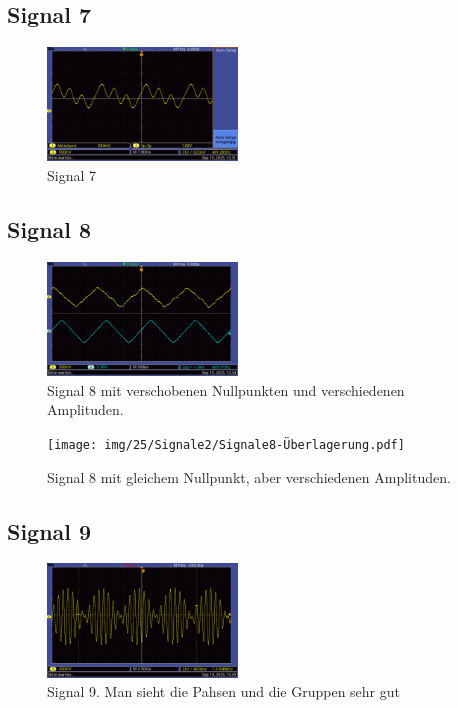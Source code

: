 \subsection*{Signal 7}
\begin{figure} [h!]
    \centering
        \includegraphics[width=0.45\textwidth]{img/25/Signale2/Signal7.pdf}
    \caption{Signal 7}
\end{figure}

\subsection*{Signal 8}
\begin{figure} [h!]
    \centering
        \includegraphics[width=0.45\textwidth]{img/25/Signale2/Signale8-deutlich-getrennt.pdf}
    \caption{Signal 8 mit verschobenen Nullpunkten und verschiedenen Amplituden.}
\end{figure}

\begin{figure} [h!]
    \centering
        \texttt{[image: img/25/Signale2/Signale8-Überlagerung.pdf]}
    \caption{Signal 8 mit gleichem Nullpunkt, aber verschiedenen Amplituden.}
\end{figure}


\subsection*{Signal 9}
\begin{figure} [h!]
    \centering
        \includegraphics[width=0.45\textwidth]{img/25/Signale2/Signal9-Gesamt.pdf}
    \caption{Signal 9. Man sieht die Pahsen und die Gruppen sehr gut}
\end{figure}

